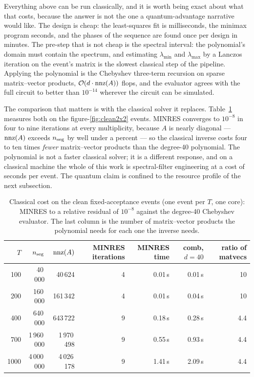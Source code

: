 \documentclass[11pt,a4paper]{article}
\begin{document}
Everything above can be run classically, and it is worth being exact about
what that costs, because the answer is not the one a quantum-advantage
narrative would like. The design is cheap: the least-squares fit is
milliseconds, the minimax program seconds, and the phases of the sequence
are found once per design in minutes. The pre-step that is not cheap is
the spectral interval: the polynomial's domain must contain the spectrum,
and estimating $\lambda_{\min}$ and $\lambda_{\max}$ by a Lanczos iteration
on the event's matrix is the slowest classical step of the pipeline.
Applying the polynomial is the Chebyshev three-term recursion on sparse
matrix--vector products, $\mathcal{O}(d\cdot{\rm nnz}(A))$ flops, and the
evaluator agrees with the full circuit to better than $10^{-14}$ wherever
the circuit can be simulated.

The comparison that matters is with the classical solver it replaces.
Table~\ref{tab:classicalcost} measures both on the figure-\ref{fig:clean2x2}
events. MINRES converges to $10^{-8}$ in four to nine iterations at every
multiplicity, because $A$ is nearly diagonal --- ${\rm nnz}(A)$ exceeds
$n_{\rm seg}$ by well under a percent --- so the classical inverse costs
four to ten times \emph{fewer} matrix--vector products than the degree-40
polynomial. The polynomial is not a faster classical solver; it is a
different response, and on a classical machine the whole of this work is
spectral-filter engineering at a cost of seconds per event. The quantum
claim is confined to the resource profile of the next subsection.

\begin{table}[H]
\centering
\small
\begin{tabular}{rrrrrrr}
\toprule
$T$ & $n_{\rm seg}$ & ${\rm nnz}(A)$ & MINRES iterations & MINRES time & comb, $d=40$ & ratio of matvecs \\
\midrule
100  & 40\,000    & 40\,624    & 4 & 0.01\,s & 0.01\,s & 10 \\
200  & 160\,000   & 161\,342   & 4 & 0.01\,s & 0.04\,s & 10 \\
400  & 640\,000   & 643\,722   & 9 & 0.18\,s & 0.28\,s & 4.4 \\
700  & 1\,960\,000 & 1\,970\,498 & 9 & 0.55\,s & 0.93\,s & 4.4 \\
1000 & 4\,000\,000 & 4\,026\,178 & 9 & 1.41\,s & 2.09\,s & 4.4 \\
\bottomrule
\end{tabular}
\caption{Classical cost on the clean fixed-acceptance events (one
event per $T$, one core): MINRES to a relative residual of $10^{-8}$
against the degree-40 Chebyshev evaluator. The last column is the number
of matrix--vector products the polynomial needs for each one the inverse
needs.}
\label{tab:classicalcost}
\end{table}
\end{document}
